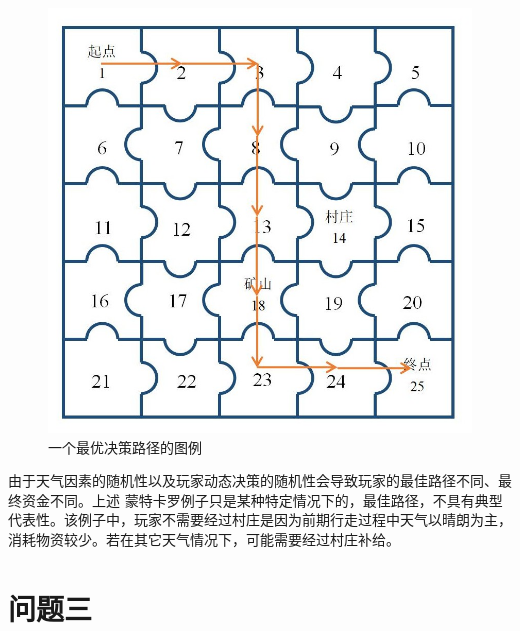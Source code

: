 \documentclass[withoutpre]{cumcmthesis} %
\begin{document}
\begin{figure}[H]
	\centering
	\includegraphics[scale=0.5]{figures/map4path.jpg}
	\caption{一个最优决策路径的图例}
	\label{fig:map4path}
\end{figure}

由于天气因素的随机性以及玩家动态决策的随机性会导致玩家的最佳路径不同、最终资金不同。上述
蒙特卡罗例子只是某种特定情况下的，最佳路径，不具有典型代表性。该例子中，玩家不需要经过村庄是因为前期行走过程中天气以晴朗为主，消耗物资较少。若在其它天气情况下，可能需要经过村庄补给。

\section{问题三}
\end{document}
